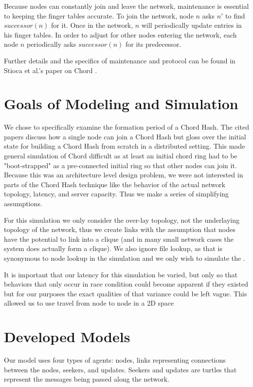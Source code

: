 \documentclass[12pt]{article} %
\begin{document}
Because nodes can constantly join and leave the network, maintenance is essential to keeping the finger tables accurate.  To join the network, node $n$ asks $n'$ to find $successor(n)$ for it.  Once in the network, $n$ will periodically update entries in his finger tables.  In order to adjust for other nodes entering the network, each node $n$ periodically asks $successor(n)$ for its predecessor. 

Further details and the specifics of maintenance and protocol can be found in Stioca et al.'s paper on Chord \cite{Chord}.



\section{Goals of Modeling and Simulation}
We chose to specifically examine the formation period of a Chord Hash. The cited papers discuss how a single node can join a Chord Hash but gloss over the initial state for building a Chord Hash from scratch in a distributed setting. This made general simulation of Chord difficult as at least an initial chord ring had to be "boot-strapped" as a pre-connected initial ring so that other nodes can join it. Because this was an architecture level design problem, we were not interested in parts of the Chord Hash technique like the behavior of the actual network topology, latency, and server capacity. Thus we make a series of simplifying assumptions.

For this simulation we only consider the over-lay topology, not the underlaying topology of the network, thus we create links with the assumption that nodes have the potential to link into a clique (and in many small network cases the system does actually form a clique).  We also ignore file lookup, as that is synonymous to node lookup in the  simulation and we only wish to simulate the .

It is important that our latency for this simulation be varied, but only so that behaviors that only occur in race condition could become apparent if they existed but for our purposes the exact qualities of that variance could be left vague. This allowed us to use travel from node to node in a 2D space


\section{Developed Models}

Our model uses four types of agents: nodes, links representing connections between the nodes, seekers, and updates.  Seekers and updates are turtles that represent the messages being passed along the network.
\end{document}

